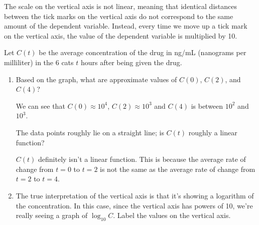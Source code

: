 \documentclass{article}
\begin{document}
\begin{enumerate}
\begin{enumerate}
    \begin{solution}
      The scale on the vertical axis is not linear, meaning
      that identical distances between the tick marks on the vertical axis
      do not correspond to the same amount of the dependent variable. 
      Instead, every time we move up a tick mark on the vertical axis, 
      the value of the dependent variable is multiplied by 10.
    \end{solution}

  \end{enumerate}
  Let $C(t)$ be the average concentration of the drug in ng/mL (nanograms per milliliter) in the 6 cats $t$ hours after being given the drug.

  \begin{enumerate}[resume]
  \item

    \begin{problem}[\stretch{0.15}]
      Based on the graph, what are approximate values of $C(0)$, $C(2)$, and $C(4)$? 
    \end{problem}

    \begin{solution}
      We can see that $C(0) \approx 10^4$, $C(2) \approx 10^3$ and $C(4)$ 
      is between $10^2$ and $10^3$.
    \end{solution}

    \begin{problem}[\nstretch{0.85}]
      The data points roughly lie on a straight line; is $C(t)$ roughly a linear function?
    \end{problem}

    \begin{solution}
      $C(t)$ definitely isn't a linear function. This is because
      the average rate of change from $t=0$ to $t=2$ is not the same
      as the average rate of change from $t=2$ to $t=4$.
    \end{solution}

  \item \label{log-linear-interpretation}

    \begin{problem}
      The true interpretation of the vertical axis is that it's showing a logarithm of the concentration. In this case, since the vertical axis has powers of 10, we're really seeing a graph of $\log_{10} C$. Label the values on the vertical axis.
    \end{problem}


\end{enumerate}
\end{enumerate}
\end{document}

